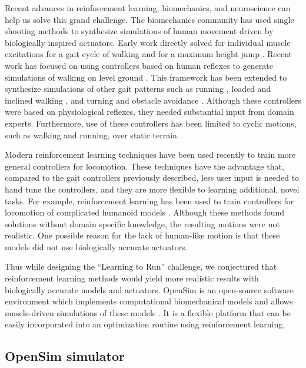 \documentclass[graybox]{svmult}
\begin{document}
Recent advances in reinforcement learning, biomechanics, and neuroscience can help us solve this grand challenge. The biomechanics community has used single shooting methods to synthesize simulations of human movement driven by biologically inspired actuators. Early work directly solved for individual muscle excitations for a gait cycle of walking \cite{anderson2001dynamic} and for a maximum height jump \cite{anderson1999dynamic}. Recent work has focused on using controllers based on human reflexes to generate simulations of walking on level ground \cite{geyer2010muscle}. This framework has been extended to synthesize simulations of other gait patterns such as running \cite{wang2012optimizing}, loaded and inclined walking \cite{dorn2015predictive}, and turning and obstacle avoidance \cite{song2015neural}. Although these controllers were based on physiological reflexes, they needed substantial input from domain experts. Furthermore, use of these controllers has been limited to cyclic motions, such as walking and running, over static terrain.

Modern reinforcement learning techniques have been used recently to train more general controllers for locomotion. These techniques have the advantage that, compared to the gait controllers previously described, less user input is needed to hand tune the controllers, and they are more flexible to learning additional, novel tasks. For example, reinforcement learning has been used to train controllers for locomotion of complicated humanoid models \cite{lillicrap2015continuous,schulman2015trust}. Although these methods found solutions without domain specific knowledge, the resulting motions were not realistic. One possible reason for the lack of human-like motion is that these models did not use biologically accurate actuators.

Thus while designing the ``Learning to Run'' challenge, we conjectured that reinforcement learning methods would yield more realistic results with biologically accurate models and actuators. OpenSim is an open-source software environment which implements computational biomechanical models and allows muscle-driven simulations of these models \cite{delp2007opensim}. It is a flexible platform that can be easily incorporated into an optimization routine using reinforcement learning.

\subsection{OpenSim simulator}\label{ss:humanoid-model}
\end{document}
